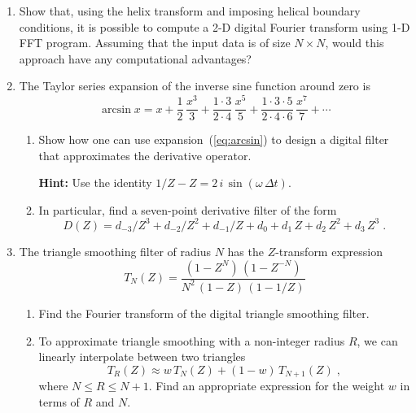 \begin{enumerate}

\item Show that, using the helix transform and imposing helical boundary conditions, it is possible to compute a 2-D digital Fourier transform using 1-D FFT program. Assuming that the input data is of size $N \times N$, would this approach have any computational advantages?

\item The Taylor series expansion of the inverse sine function around zero is
\begin{equation}
  \label{eq:arcsin}
  \arcsin{x} = x + \frac{1}{2}\,\frac{x^3}{3} + 
  \frac{1 \cdot 3}{2 \cdot 4}\,\frac{x^5}{5} + 
  \frac{1 \cdot 3 \cdot 5}{2 \cdot 4 \cdot 6}\,\frac{x^7}{7} + 
  \cdots
\end{equation}
\begin{enumerate}
\item Show how one can use expansion~(\ref{eq:arcsin}) to design a
  digital filter that approximates the derivative
  operator. 

  \textbf{Hint:} Use the identity $1/Z-Z = 2\,i\,\sin(\omega\,\Delta t)$.

\item In particular, find a seven-point derivative filter of the form
\begin{equation}
  \label{eq:d6}
  D(Z) = d_{-3}/Z^{3} + d_{-2}/Z^{2} + d_{-1}/Z + d_0 + 
  d_1\,Z + d_2\,Z^2 + d_3\,Z^3\;.
\end{equation}
\end{enumerate}

\item The triangle smoothing filter of radius $N$ has the $Z$-transform expression
\begin{equation}
\label{eq:triangle}
T_N(Z) = \displaystyle \frac{(1-Z^N)\,(1-Z^{-N})}{N^2\,(1-Z)\,(1-1/Z)}
\end{equation}

\begin{enumerate}
\item Find the Fourier transform of the digital triangle smoothing filter.
\item To approximate triangle smoothing with a non-integer radius $R$,
  we can linearly interpolate between two triangles
\begin{equation}
\label{eq:triangle}
T_R(Z) \approx w\,T_N(Z) + (1-w)\,T_{N+1}(Z)\;, 
\end{equation}
where $N \le R \le N+1$. Find an appropriate expression for the weight
$w$ in terms of $R$ and $N$.
\end{enumerate}

\end{enumerate}

